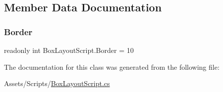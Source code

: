 \subsection{Member Data Documentation}
\mbox{\label{classBoxLayoutScript_a1d68769db2eb86997d9c7cc937ab92ff}} 
\subsubsection{\texorpdfstring{Border}{Border}}
{\footnotesize\ttfamily readonly int Box\+Layout\+Script.\+Border = 10\hspace{0.3cm}{\ttfamily [static]}}



The documentation for this class was generated from the following file\+:\begin{DoxyCompactItemize}
\item 
Assets/\+Scripts/\hyperlink{BoxLayoutScript_8cs}{Box\+Layout\+Script.\+cs}\end{DoxyCompactItemize}
